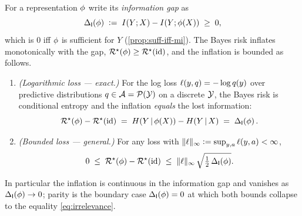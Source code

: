 \begin{corollary}
\label{cor:ratedist-gap}
For a representation $\phi$ write its \emph{information gap} as
\[
  \Delta_{\mathsf{I}}\!\left(\phi\right) \;\vcentcolon=\; I(Y ; X) - I(Y ; \phi(X)) \;\ge\; 0,
\]
which is $0$ iff $\phi$ is sufficient for $Y$ (\cref{prop:suff-iff-mi}). The
Bayes risk inflates monotonically with the gap, $\mathcal{R}^{\star}(\phi) \ge
\mathcal{R}^{\star}(\mathrm{id})$, and the inflation is bounded as follows.
\begin{enumerate}
  \item[(a)] \emph{(Logarithmic loss --- exact.)} For the log loss
    $\ell(y,q) = -\log q(y)$ over predictive distributions
    $q \in \mathcal{A} = \mathcal{P}(\mathcal{Y})$ on a discrete $\mathcal{Y}$, the Bayes
    risk is conditional entropy and the inflation \emph{equals} the lost
    information:
    \begin{equation}
      \label{eq:logloss-exact}
      \mathcal{R}^{\star}(\phi) - \mathcal{R}^{\star}(\mathrm{id})
      \;=\; H(Y \,\vert\, \phi(X)) - H(Y \,\vert\, X)
      \;=\; \Delta_{\mathsf{I}}\!\left(\phi\right).
    \end{equation}
  \item[(b)] \emph{(Bounded loss --- general.)} For any loss with
    $\|\ell\|_\infty \vcentcolon= \sup_{y,a}\ell(y,a) < \infty$,
    \begin{equation}
      \label{eq:ratedist-bound}
      0 \;\le\; \mathcal{R}^{\star}(\phi) - \mathcal{R}^{\star}(\mathrm{id})
        \;\le\; \|\ell\|_\infty\,\sqrt{\tfrac12\,\Delta_{\mathsf{I}}\!\left(\phi\right)}.
    \end{equation}
\end{enumerate}
In particular the inflation is continuous in the information gap and vanishes as
$\Delta_{\mathsf{I}}\!\left(\phi\right)\to 0$; parity is the boundary case $\Delta_{\mathsf{I}}\!\left(\phi\right)=0$ at which
both bounds collapse to the equality \eqref{eq:irrelevance}.
\end{corollary}

